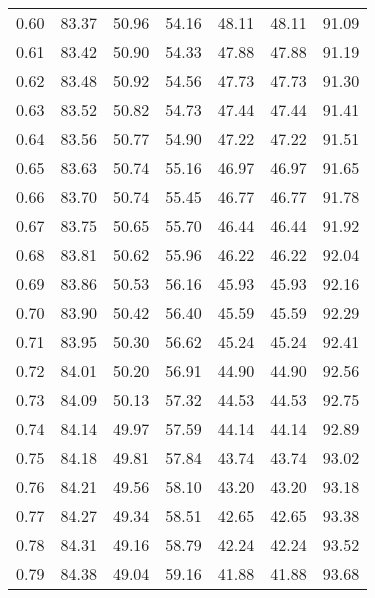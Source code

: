 \begin{tabular}{|c|c|c|c|c|c|c|}
      0.60 &     83.37 &     50.96 &      54.16 &   48.11 &      48.11 &         91.09 \\
      0.61 &     83.42 &     50.90 &      54.33 &   47.88 &      47.88 &         91.19 \\
      0.62 &     83.48 &     50.92 &      54.56 &   47.73 &      47.73 &         91.30 \\
      0.63 &     83.52 &     50.82 &      54.73 &   47.44 &      47.44 &         91.41 \\
      0.64 &     83.56 &     50.77 &      54.90 &   47.22 &      47.22 &         91.51 \\
      0.65 &     83.63 &     50.74 &      55.16 &   46.97 &      46.97 &         91.65 \\
      0.66 &     83.70 &     50.74 &      55.45 &   46.77 &      46.77 &         91.78 \\
      0.67 &     83.75 &     50.65 &      55.70 &   46.44 &      46.44 &         91.92 \\
      0.68 &     83.81 &     50.62 &      55.96 &   46.22 &      46.22 &         92.04 \\
      0.69 &     83.86 &     50.53 &      56.16 &   45.93 &      45.93 &         92.16 \\
      0.70 &     83.90 &     50.42 &      56.40 &   45.59 &      45.59 &         92.29 \\
      0.71 &     83.95 &     50.30 &      56.62 &   45.24 &      45.24 &         92.41 \\
      0.72 &     84.01 &     50.20 &      56.91 &   44.90 &      44.90 &         92.56 \\
      0.73 &     84.09 &     50.13 &      57.32 &   44.53 &      44.53 &         92.75 \\
      0.74 &     84.14 &     49.97 &      57.59 &   44.14 &      44.14 &         92.89 \\
      0.75 &     84.18 &     49.81 &      57.84 &   43.74 &      43.74 &         93.02 \\
      0.76 &     84.21 &     49.56 &      58.10 &   43.20 &      43.20 &         93.18 \\
      0.77 &     84.27 &     49.34 &      58.51 &   42.65 &      42.65 &         93.38 \\
      0.78 &     84.31 &     49.16 &      58.79 &   42.24 &      42.24 &         93.52 \\
      0.79 &     84.38 &     49.04 &      59.16 &   41.88 &      41.88 &         93.68 \\

\end{tabular}
